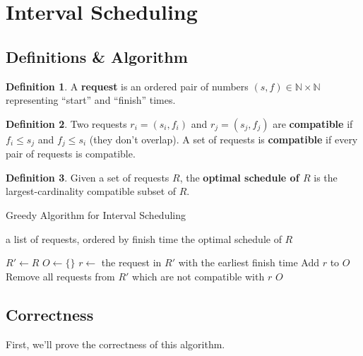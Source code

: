 \documentclass[11pt]{article}
\newcommand{\Desc}[2]{\State \makebox[2em][l]{#1}#2}
\theoremstyle{plain}
\theoremstyle{definition}
\newtheorem*{defn}{Definition}
\newcommand{\N}{\mathbb{N}}
\begin{document}
\section{Interval Scheduling}
\subsection{Definitions \& Algorithm}

\begin{defn}
    A {\bf request} is an ordered pair of numbers $(s, f) \in \N \times \N$ representing ``start'' and ``finish'' times.
\end{defn}

\begin{defn}
    Two requests $r_i = (s_i, f_i)$ and $r_j = (s_j, f_j)$ are {\bf compatible} if $f_i \leq s_j$ and
    $f_j \leq s_i$ (they don't overlap). A set of requests is {\bf compatible} if every pair of requests is compatible.
\end{defn}

\begin{defn}
    Given a set of requests $R$, the \textbf{optimal schedule of $R$} is the largest-cardinality compatible 
    subset of $R$.
\end{defn}

\begin{algorithm}
    \caption{Greedy Algorithm for Interval Scheduling}
    \begin{algorithmic}
        \Input
        \Desc{$R$}{a list of requests, ordered by finish time}
        \EndInput
        \Output
        \Desc{$C$}{the optimal schedule of $R$}
        \EndOutput
    \end{algorithmic}
    \vspace{3pt}
    \begin{algorithmic}[1]
        \State $R' \gets R$
        \State $O \gets \{\}$
            \State $r \gets$ the request in $R'$ with the earliest finish time
            \State Add $r$ to $O$
            \State Remove all requests from $R'$ which are not compatible with $r$
        \EndWhile
        \State \Return $O$
    \end{algorithmic}
\end{algorithm}

\subsection{Correctness}

First, we'll prove the correctness of this algorithm.
\end{document}
